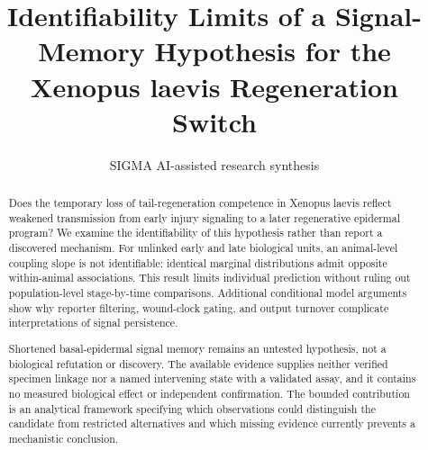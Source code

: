 \documentclass[11pt]{article}
\title{Identifiability Limits of a Signal-Memory Hypothesis for the Xenopus laevis Regeneration Switch}
\date{}
\author{SIGMA AI-assisted research synthesis}
\begin{document}
\maketitle

\begin{abstract}
Does the temporary loss of tail-regeneration competence in Xenopus laevis reflect weakened transmission from early injury signaling to a later regenerative epidermal program? We examine the identifiability of this hypothesis rather than report a discovered mechanism. For unlinked early and late biological units, an animal-level coupling slope is not identifiable: identical marginal distributions admit opposite within-animal associations. This result limits individual prediction without ruling out population-level stage-by-time comparisons. Additional conditional model arguments show why reporter filtering, wound-clock gating, and output turnover complicate interpretations of signal persistence.

Shortened basal-epidermal signal memory remains an untested hypothesis, not a biological refutation or discovery. The available evidence supplies neither verified specimen linkage nor a named intervening state with a validated assay, and it contains no measured biological effect or independent confirmation. The bounded contribution is an analytical framework specifying which observations could distinguish the candidate from restricted alternatives and which missing evidence currently prevents a mechanistic conclusion.
\end{abstract}
\begingroup\setlength{\fboxsep}{10pt}
\noindent{}\endgroup\par\medskip
\end{document}
